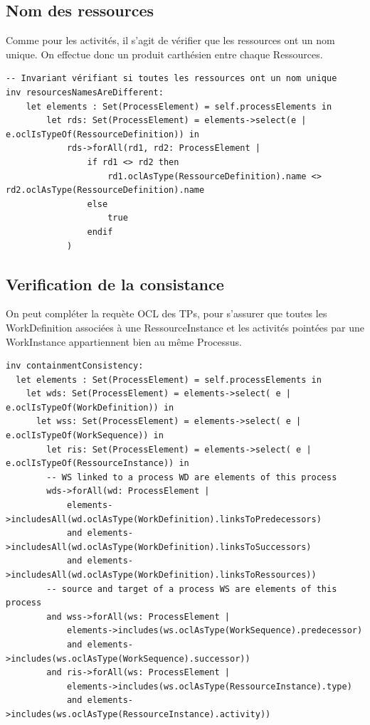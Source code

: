 \documentclass{report}
\begin{document}
\subsection{Nom des ressources}

Comme pour les activités, il s'agit de vérifier que les ressources ont un nom unique.
On effectue donc un produit carthésien entre chaque Ressources.\\

\begin{verbatim}
-- Invariant vérifiant si toutes les ressources ont un nom unique
inv resourcesNamesAreDifferent:
	let elements : Set(ProcessElement) = self.processElements in
    	let rds: Set(ProcessElement) = elements->select(e | e.oclIsTypeOf(RessourceDefinition)) in
			rds->forAll(rd1, rd2: ProcessElement |
				if rd1 <> rd2 then
					rd1.oclAsType(RessourceDefinition).name <> rd2.oclAsType(RessourceDefinition).name
				else
					true
				endif
			)
\end{verbatim}

\subsection{Verification de la consistance}

On peut compléter la requète OCL des TPs, pour s'assurer que toutes les WorkDefinition associées à une RessourceInstance et les activités pointées par une WorkInstance appartiennent bien au même Processus.

\begin{verbatim}
inv containmentConsistency:
  let elements : Set(ProcessElement) = self.processElements in
    let wds: Set(ProcessElement) = elements->select( e | e.oclIsTypeOf(WorkDefinition)) in
      let wss: Set(ProcessElement) = elements->select( e | e.oclIsTypeOf(WorkSequence)) in
		let ris: Set(ProcessElement) = elements->select( e | e.oclIsTypeOf(RessourceInstance)) in
        -- WS linked to a process WD are elements of this process
        wds->forAll(wd: ProcessElement |
            elements->includesAll(wd.oclAsType(WorkDefinition).linksToPredecessors)
            and elements->includesAll(wd.oclAsType(WorkDefinition).linksToSuccessors)
			and elements->includesAll(wd.oclAsType(WorkDefinition).linksToRessources))
        -- source and target of a process WS are elements of this process
        and wss->forAll(ws: ProcessElement |
            elements->includes(ws.oclAsType(WorkSequence).predecessor)
            and elements->includes(ws.oclAsType(WorkSequence).successor))
		and ris->forAll(ws: ProcessElement |
            elements->includes(ws.oclAsType(RessourceInstance).type)
			and elements->includes(ws.oclAsType(RessourceInstance).activity))
\end{verbatim}
\end{document}
